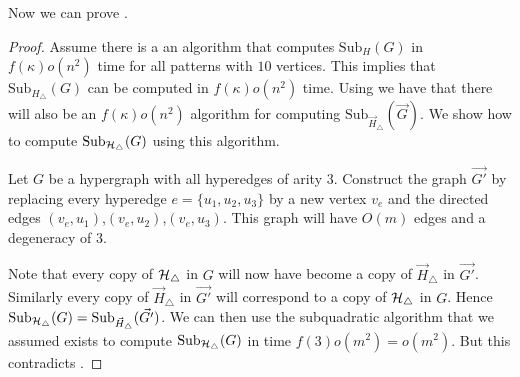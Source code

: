 \documentclass[a4paper,UKenglish,cleveref, autoref, numberwithinsect, thm-restate]{lipics-v2021}
\newcommand{\hyperthree}{\cH_\triangle}
\newcommand{\Sub}[2]{\mathrm{Sub}_{#2}(#1)}
\newcommand{\degen}{\kappa}
\newcommand{\cH}{{\cal H}}
\begin{document}
	Now we can prove .
	\hardness*
	\begin{proof}
		Assume there is a an algorithm that computes $\Sub{G}{H}$ in $f(\degen)o(n^2)$ time for all patterns with $10$ vertices. This implies that $\Sub{G}{H_\triangle}$ can be computed in $f(\degen)o(n^2)$ time. Using  we have that there will also be an $f(\degen)o(n^2)$ algorithm for computing $\Sub{\vec{G}}{\vec{H}_\triangle}$. We show how to compute $\Sub{G}{\hyperthree}$ using this algorithm.
		
		Let $G$ be a hypergraph with all hyperedges of arity $3$. Construct the graph $\vec{G'}$ by replacing every hyperedge $e=\{u_1,u_2,u_3\}$ by a new vertex $v_e$ and the directed edges $(v_e,u_1)$,$(v_e,u_2)$,$(v_e,u_3)$. This graph will have $O(m)$ edges and a degeneracy of $3$.
		
		Note that every copy of $\hyperthree$ in $G$ will now have become a copy of $\vec{H}_\triangle$ in $\vec{G'}$. Similarly every copy of $\vec{H}_\triangle$ in $\vec{G'}$ will correspond to a copy of $\hyperthree$ in $G$. Hence $\Sub{G}{\hyperthree} = \Sub{\vec{G'}}{\vec{H}_\triangle}$. We can then use the subquadratic algorithm that we assumed exists to compute $\Sub{G}{\hyperthree}$ in time $f(3)o(m^2) =o(m^2)$. But this contradicts .
	\end{proof}
	

	
\end{document}
